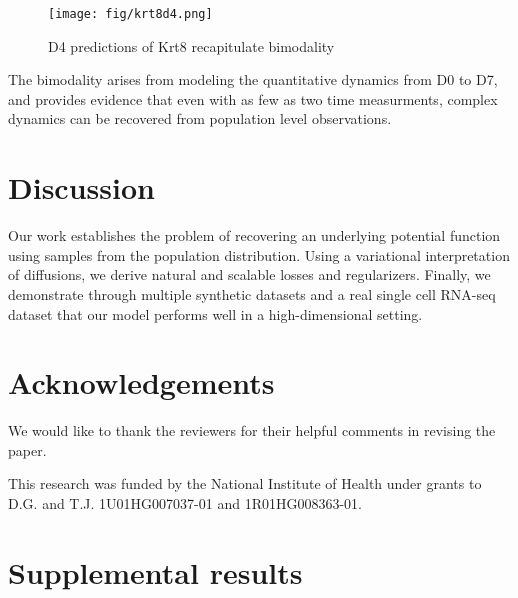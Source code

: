\documentclass{article}
\begin{document}
\begin{figure}
\vspace{-5pt}
\centering
\texttt{[image: fig/krt8d4.png]}
\vspace{-7pt}
\caption{D4 predictions of Krt8 recapitulate bimodality}
\label{fig:krt8d4}
\vspace{-15pt}
\end{figure}

The bimodality arises from modeling the quantitative dynamics from D0 to D7, and provides evidence that even with as few as two time measurments, complex dynamics can be recovered from population level observations.

\section{Discussion}

Our work establishes the problem of recovering an underlying potential function using samples from the population distribution. Using a variational interpretation of diffusions, we derive natural and scalable losses and regularizers. Finally, we demonstrate through multiple synthetic datasets and a real single cell RNA-seq dataset that our model performs well in a high-dimensional setting.

\section*{Acknowledgements}
We would like to thank the reviewers for their helpful comments in revising the paper.

This research was funded by the National Institute of Health under grants to D.G. and T.J. 1U01HG007037-01 and 1R01HG008363-01.



\newpage
\onecolumn
\setcounter{section}{18}
\renewcommand\thesection{\Alph{section}}
\setcounter{figure}{0}
\renewcommand\thefigure{\thesection.\arabic{figure}}


\section{Supplemental results}
\end{document}
